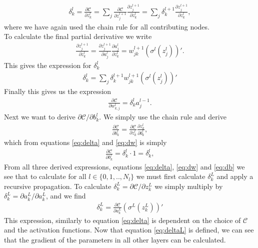 \begin{align*}
    \delta_k^l = \frac{\partial \mathcal{C}}{\partial z^l_k}
               = \sum_j \frac{\partial \mathcal{C}}{\partial z^{l+1}_j}\frac{\partial z_j^{l+1}}{\partial z^l_k}  
               = \sum_j \delta_k^{l+1}\frac{\partial z_j^{l+1}}{\partial z^l_k},
\end{align*}
where we have again used the chain rule for all contributing nodes.
\\
To calculate the final partial derivative we write
\begin{align*}
    \frac{\partial z_j^{l+1}}{\partial z^l_k} = \frac{\partial z_j^{l+1}}{\partial a^l_j}\frac{\partial a^l_j}{\partial z^l_k}
                                              = w_{jk}^{l+1}(\sigma^l(z_j^l))'.
\end{align*}
This gives the expression for $\delta_k^l$
\begin{align}\label{eq:delta}
    \delta_k^l  = \sum_j \delta_k^{l+1}w_{jk}^{l+1}(\sigma^l(z_j^l))'  
\end{align}
Finally this gives us the expression
\begin{align}\label{eq:dw}
    \frac{\partial \mathcal{C}}{\partial w_{k,j}^l} = \delta_k^{l} a_j^{l-1}.
\end{align}
Next we want to derive $\partial \mathcal{C}/\partial b^l_k$. We simply use the chain rule and derive
\begin{align*}
    \frac{\partial \mathcal{C}}{\partial b^l_k} = \frac{\partial \mathcal{C}}{\partial z^l_k}\frac{\partial z_k^l}{\partial b^l_k},
\end{align*}
which from equations \ref{eq:delta} and \ref{eq:dw} is simply
\begin{align}\label{eq:db}
    \frac{\partial \mathcal{C}}{\partial b^l_k} = \delta_k^{l} \cdot 1 = \delta_k^{l},
\end{align}
From all three derived expressions, equations \ref{eq:delta}, \ref{eq:dw} and \ref{eq:db} we see that 
to calculate for all $l\in\{0,1,..,N_l\}$ we must first calculate $\delta_k^L$ and apply a recursive propagation.
To calculate $\delta_k^L = \partial \mathcal{C}/\partial z^L_k$ we simply multiply by $\delta_k^L = \partial a_k^L/\partial a_k^L$, and we find
\begin{align}\label{eq:deltaL}
    \delta_k^L = \frac{\partial \mathcal{C}}{\partial a^L_k}\left(\sigma^L(z_k^L)\right)'
\end{align}
This expression, similarly to equation \ref{eq:delta} is dependent on the choice of $\mathcal{C}$ and 
the activation functions. Now that equation \ref{eq:deltaL} is defined, we can see that the
gradient of the parameters in all other layers can be calculated. 

